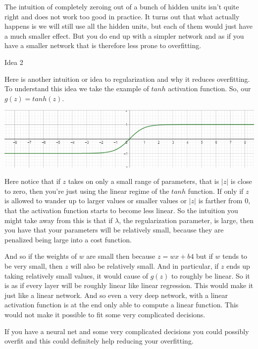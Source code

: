 \documentclass{article}
\begin{document}
{The intuition of completely zeroing out of a bunch of hidden units isn't quite right and does not work too good in practice. It turns out that what actually happens is we will still use all the hidden units, but each of them would just have a much smaller effect. But you do end up with a simpler network and as if you have a smaller network that is therefore less prone to overfitting.

\vspace{5}
Idea 2
\vspace{5}

Here is another intuition or idea to regularization and why it reduces overfitting. To understand this idea we take the example of $tanh$ activation function. So, our $g(z) = tanh(z)$.
\vspace{5}

\includegraphics[width=\textwidth]{tanh.png}

\vspace{5}
Here notice that if $z$ takes on only a small range of parameters, that is $|z|$ is close to zero, then you're just using the linear regime of the $tanh$ function. If only if $z$ is allowed to wander up to larger values or smaller values or $|z|$ is farther from 0, that the activation function starts to become less linear. So the intuition you might take away from this is that if $\lambda$, the regularization parameter, is large, then you have that your parameters will be relatively small, because they are penalized being large into a cost function.

And so if the weights of $w$ are small then because $z = wx+b4$ but if $w$ tends to be very small, then $z$ will also be relatively small. And in particular, if $z$ ends up taking relatively small values, it would cause of $g(z)$ to roughly be linear. So it is as if every layer will be roughly linear like linear regression. This would make it just like a linear network. And so even a very deep network, with a linear activation function is at the end only able to compute a linear function. This would not make it possible to fit some very complicated decisions.

If you have a neural net and some very complicated decisions you could possibly overfit and this could definitely help reducing your overfitting.


}
\end{document}
